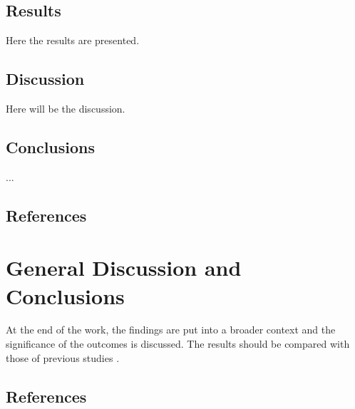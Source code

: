 \documentclass[%
a4paper,12pt,ngerman,UKenglish,twoside]{book}
\begin{document}
\begin{refsection}
\section{Results}
Here the results are presented.

\section{Discussion}
Here will be the discussion.

\section{Conclusions}
...

\section[References]{References}
\printbibliography[heading=none]
\end{refsection}


%

\chapter{General Discussion and Conclusions}
\begin{refsection}

At the end of the work, the findings are put into a broader context and the significance of the outcomes is discussed. The results should be compared with those of previous studies \cite{wieland_automated_2017, fruh_modelling_2018}. 

\section[References]{References}
\printbibliography[heading=none]
\end{refsection}
\end{document}
